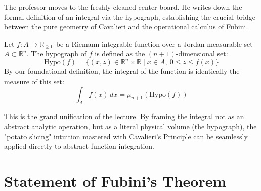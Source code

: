 \begin{ai-note}
The professor moves to the freshly cleaned center board. He writes down the formal definition of an integral via the hypograph, establishing the crucial bridge between the pure geometry of Cavalieri and the operational calculus of Fubini.
\end{ai-note}

\begin{math-stroke}
Let $f: A \to \mathbb{R}_{\ge 0}$ be a Riemann integrable function over a Jordan measurable set $A \subset \mathbb{R}^n$.
The hypograph of $f$ is defined as the $(n+1)$-dimensional set:
\[
\text{Hypo}(f) = \{ (x, z) \in \mathbb{R}^n \times \mathbb{R} \mid x \in A, \ 0 \le z \le f(x) \}
\]
By our foundational definition, the integral of the function is identically the measure of this set:
\[
\int_A f(x) \, dx = \mu_{n+1}(\text{Hypo}(f))
\]
\end{math-stroke}

\begin{didactic-insight}
This is the grand unification of the lecture. By framing the integral not as an abstract analytic operation, but as a literal physical volume (the hypograph), the "potato slicing" intuition mastered with Cavalieri's Principle can be seamlessly applied directly to abstract function integration.
\end{didactic-insight}

\section{Statement of Fubini's Theorem}

